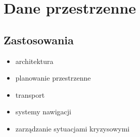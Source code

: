\documentclass[12pt]{article}
\begin{document}
\begin{comment}
NESTED-LOOP JOIN
 * Zlaczenie r x_omega s

 * relacja r jest nazywana zewnetrzna relacja (outer relation)
 * relacja s jest nazywana wewnetrzna relacja (innej relation)
 * Algorytm nie wymaga zadnych indeksow i moze byc stosowany dla zlaczenia kazdego typu
 * bardzo kosztowny

NESTED-LOOP JOIN
 * w najgorszym przypadku (jeden blok w pamieci dla kazdej z relacji)
  n_r * b_s + b_r
 * w najlepszym przypadku (jesli relacja wewnetrzna miesci sie w pamieci)
  b_r + b_s
 * jesli mniejsza relacja miesci sie w pamieci , to powinna byc relacja wewnetrzna

BLOCK NESTED-LOOP JOIN
 * wariant algorytmu nested-loop join w ktorym kazdy blok relacji zewnetrznej przetwarzamy z relacja zewnetrzna

 * koszt
  - w najgorszym przypadku
  b_r * b_s + b_r
  - w najlepszym przypadku
  b_r + b_s

 * jesli zlaczenie jest rownozlaczeniem i dotyczy atrybutu ktory jest kluczem relacji wewnetrznej to przetwarzanie w petli wewnetrznej moze sie zatrzymac 
 * relacja wewnetrzna moze byc skanowana na przemian w przod i wstecz (zgodnosc z algorytmem LRU)

INDEXED NESTED-LOOP JOIN
 * zamiast skanowania relacji wewnetrznej mozna uzyc indeksu
  - zlaczenie jest rownorozlaczeniem
  - istnieje odpowiedni indeks dla relacji wewnetrznej
    - jezeli indeks nie istnieje to mozna rozwazyc utworzenie indeksu

 * jesli dostepne sa indeksy dla obu relacji to jako zewn. nalezy wybrac relacje o mniejszej liczbie krotek

Inne zagadnienia
- co z wynikami posrednimi
- zeby zrealizowac zadanie trzeba wykonac kilka operacji
- wyjscie operacji jest wejsciem dla kolejnej

Podsumowanie
- Optymalizacja kosztowa jest kosztowna
- Alternatywa
 - optymalizacja regulowa
 - rozwiazania mieszane
  - optymalizacja regulowa + kosztowa (odciecie bezsensownych rozwiazan)
  (optymalizacja regulowa nei sprawdzala sie sama bo nie brala pod uwage dystrybucji danych)
\end{comment}

\section{Dane przestrzenne}

\subsection{Zastosowania}
\begin{itemize}
\item architektura
\item planowanie przestrzenne
\item transport
\item systemy nawigacji
\item zarządzanie sytuacjami kryzysowymi
\end{itemize}
\end{document}
